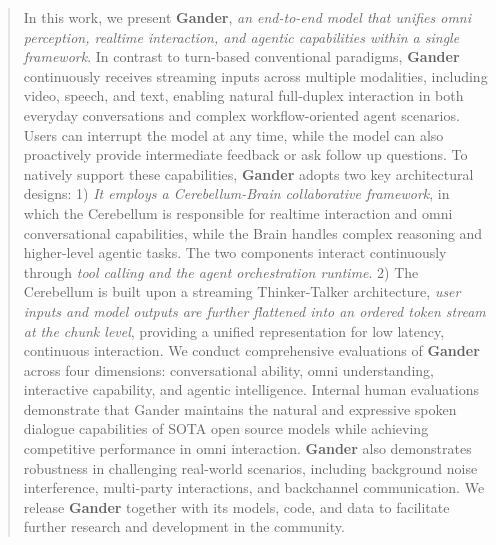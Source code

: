 

\begin{abstract}



In this work, we present \textbf{Gander}, \emph{an end-to-end model that unifies omni perception, realtime interaction, and agentic capabilities within a single framework}. In contrast to turn-based conventional paradigms, \textbf{Gander} continuously receives streaming inputs across multiple modalities, including video, speech, and text, enabling natural full-duplex interaction in both everyday conversations and complex workflow-oriented agent scenarios. Users can interrupt the model at any time, while the model can also proactively provide intermediate feedback or ask follow up questions. To natively support these capabilities, \textbf{Gander} adopts two key architectural designs: 1)\emph{ It employs a Cerebellum-Brain collaborative framework}, in which the Cerebellum is responsible for realtime interaction and omni conversational capabilities, while the Brain handles complex reasoning and higher-level agentic tasks. The two components interact continuously through \emph{tool calling and the agent orchestration runtime}. 2) The Cerebellum is built upon a streaming Thinker-Talker architecture, \emph{user inputs and model outputs are further flattened into an ordered token stream at the chunk level}, providing a unified representation for low latency, continuous interaction. We conduct comprehensive evaluations of \textbf{Gander} across four dimensions: conversational ability, omni understanding, interactive capability, and agentic intelligence. Internal human evaluations demonstrate that Gander maintains the natural and expressive spoken dialogue capabilities of SOTA open source models while achieving competitive performance in omni interaction. \textbf{Gander} also demonstrates robustness in challenging real-world scenarios, including background noise interference, multi-party interactions, and backchannel communication. We release \textbf{Gander} together with its models, code, and data to facilitate further research and development in the community.



\end{abstract}
